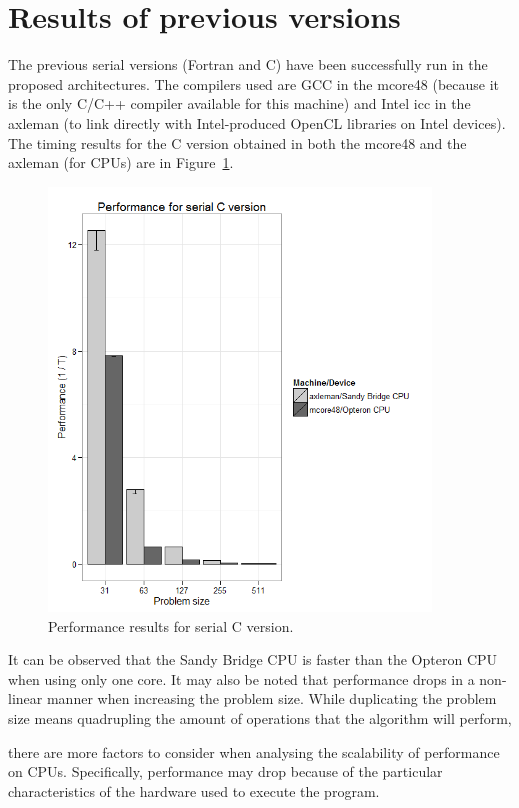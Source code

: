 \section{Results of previous versions}

The previous serial versions (Fortran and C) have been successfully run in the proposed architectures. The compilers used are GCC in the mcore48 (because it is the only C/C++ compiler available for this machine) and Intel icc in the axleman (to link directly with Intel-produced OpenCL libraries on Intel devices). The timing results for the C version obtained in both the mcore48 and the axleman (for CPUs) are in Figure~\ref{f:serial}.


\begin{figure}[!h]
\begin{center}
\centerline{\includegraphics[width=4in]{img/serial}}
\caption{Performance results for serial C version.}
\label{f:serial}
\end{center}
\end{figure}

It can be observed that the Sandy Bridge CPU is faster than the Opteron CPU when using only one core. It may also be noted that performance drops in a non-linear manner when increasing the problem size. While duplicating the problem size means quadrupling the amount of operations that the algorithm will perform,

there are more factors to consider when analysing the scalability of performance on CPUs. Specifically, performance may drop because of the particular characteristics of the hardware used to execute the program.


